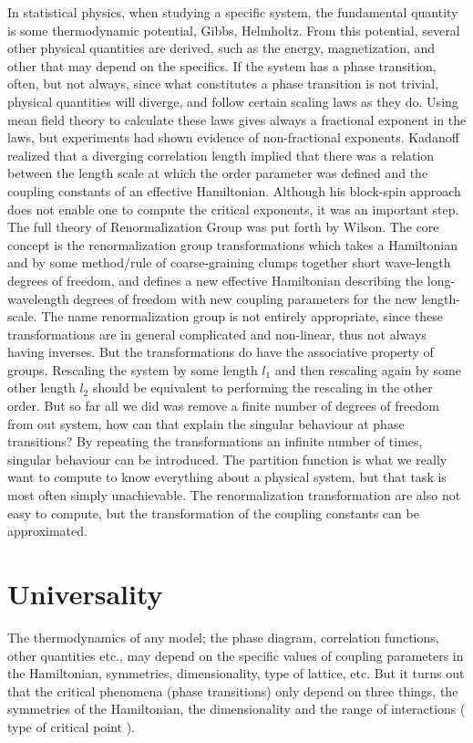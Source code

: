 In statistical physics, when studying a specific system, the fundamental quantity is some thermodynamic potential,  Gibbs, Helmholtz. From this potential, several other physical quantities are derived, such as the energy, magnetization, and other that may depend on the specifics. 
If the system has a phase transition, often, but not always, since what constitutes a phase transition is not trivial, physical quantities will diverge, and follow certain scaling laws as they do. 
Using mean field theory to calculate these laws gives always a fractional exponent in the laws, but experiments had shown evidence of non-fractional exponents. 
Kadanoff realized that a diverging correlation length implied that there was a relation between the length scale at which the order parameter was defined and the coupling constants of an effective Hamiltonian.
Although his block-spin approach does not enable one to compute the critical exponents, it was an important step.
The full theory of Renormalization Group was put forth by Wilson.
The core concept is the renormalization group transformations which takes a Hamiltonian and by some method/rule of coarse-graining clumps together short wave-length degrees of freedom, and defines a new effective Hamiltonian describing the long-wavelength degrees of freedom with new coupling parameters for the new length-scale.
The name renormalization group is not entirely appropriate, since these transformations are in general complicated and non-linear, thus not always having inverses. But the transformations do have the associative property of groups. Rescaling the system by some length $l_1$ and then rescaling again by some other length $l_2$ should be equivalent to performing the rescaling in the other order.
But so far all we did was remove a finite number of degrees of freedom from out system, how can that explain the singular behaviour at phase transitions? By repeating the transformations an infinite number of times, singular behaviour can be introduced.
The partition function is what we really want to compute to know everything about a physical system, but that task is most often simply unachievable. The renormalization transformation are also not easy to compute, but the transformation of the coupling constants can be approximated.

\section{Universality}
The thermodynamics of any model; the phase diagram, correlation functions, other quantities etc., may depend on the specific values of coupling parameters in the Hamiltonian, symmetries, dimensionality, type of lattice, etc. 
But it turns out that the critical phenomena (phase transitions) only depend on three things, the symmetries of the Hamiltonian, the dimensionality and the range of interactions ( type of critical point ).

